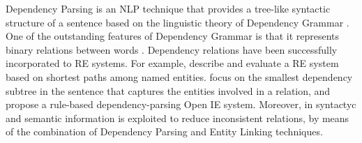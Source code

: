 



Dependency Parsing is an NLP technique that provides a tree-like syntactic structure of a sentence based on the linguistic theory of Dependency Grammar \citep{Tesniere1959}. One of the outstanding features of Dependency Grammar is that it represents binary relations between words \citep{BallesterosNivre2013}.%
Dependency relations have been successfully incorporated to RE systems. For example, \citep{BunescuandMooney2005} describe and evaluate a RE system based on shortest paths among named entities. \citep{CulottaSorensen2004} focus on the smallest dependency subtree in the sentence that captures the entities involved in a relation, and \citep{Gamallo2012} propose a rule-based dependency-parsing Open IE system. Moreover, in \citep{Nakasholeetal2012,MoroandNavigli2012,DelliBovietal2015b} syntactyc and semantic information is exploited to reduce inconsistent relations, by means of the combination of Dependency Parsing and Entity Linking techniques.


